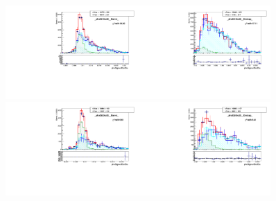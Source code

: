 \begin{figure}[htb]
  \begin{center}
   \includegraphics[width=0.45\textwidth]{../figs/figs_v11/MUON_WGamma/TemplateFits/c_TEMPL_SIHIH_UNblind__phoEt15to20__Barrel__RooFit_MCclosure.pdf}\includegraphics[width=0.45\textwidth]{../figs/figs_v11/MUON_WGamma/TemplateFits/c_TEMPL_SIHIH_UNblind__phoEt15to20__Endcap__RooFit_MCclosure.pdf}\\
   \includegraphics[width=0.45\textwidth]{../figs/figs_v11/MUON_WGamma/TemplateFits/c_TEMPL_SIHIH_UNblind__phoEt20to25__Barrel__RooFit_MCclosure.pdf}\includegraphics[width=0.45\textwidth]{../figs/figs_v11/MUON_WGamma/TemplateFits/c_TEMPL_SIHIH_UNblind__phoEt20to25__Endcap__RooFit_MCclosure.pdf}\\

\end{center}
\end{figure}
